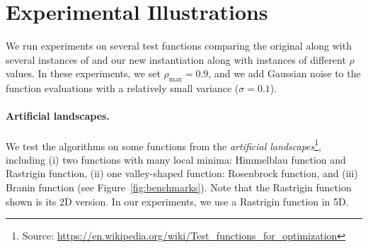 \section{Experimental Illustrations}\label{sec:gpo.experiments}

We run experiments on several test functions comparing the original \POO along with several instances of \HOO and our new instantiation \PCT along with \HCT instances of different $\rho$ values. In these experiments, we set $\rho_{\max} = 0.9$, and we add Gaussian noise to the function evaluations with a relatively small variance ($\sigma=0.1$).

\paragraph{Artificial landscapes.}
We test the algorithms on some functions from the \emph{artificial landscapes}\footnote{Source: \url{https://en.wikipedia.org/wiki/Test_functions_for_optimization}}, including (i) two functions with many local minima: Himmelblau function and Rastrigin function, (ii) one valley-shaped function: Rosenbrock function, and (iii) Branin function (see Figure~\ref{fig:benchmarks}). Note that the Rastrigin function shown is its 2D version. In our experiments, we use a Rastrigin function in 5D.


